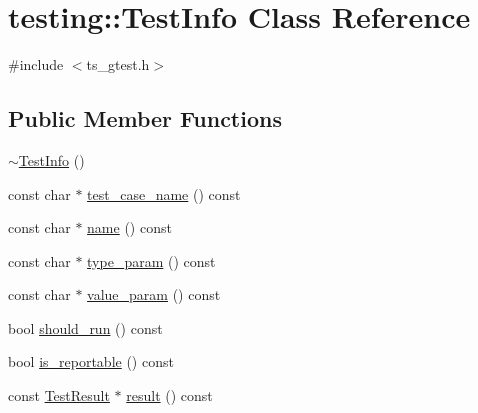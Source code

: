 \hypertarget{classtesting_1_1TestInfo}{\section{testing\-:\-:Test\-Info Class Reference}
\label{classtesting_1_1TestInfo}
}


{\ttfamily \#include $<$ts\-\_\-gtest.\-h$>$}

\subsection*{Public Member Functions}
\begin{DoxyCompactItemize}
\item 
\hyperlink{classtesting_1_1TestInfo_a8d382c1b1b511f0d9112c14684809852}{$\sim$\-Test\-Info} ()
\item 
const char $\ast$ \hyperlink{classtesting_1_1TestInfo_a26d22556d04b94c9cd15e28d74fef91c}{test\-\_\-case\-\_\-name} () const 
\item 
const char $\ast$ \hyperlink{classtesting_1_1TestInfo_ab3d24cad310f0cde29a80b9a83949ff5}{name} () const 
\item 
const char $\ast$ \hyperlink{classtesting_1_1TestInfo_af15d5c533a7237ffc183bc4c924dfcf4}{type\-\_\-param} () const 
\item 
const char $\ast$ \hyperlink{classtesting_1_1TestInfo_a9671fbc0effcb32e98803888dc166a66}{value\-\_\-param} () const 
\item 
bool \hyperlink{classtesting_1_1TestInfo_a240c9fb051d7b0586ed380c6b4e729e4}{should\-\_\-run} () const 
\item 
bool \hyperlink{classtesting_1_1TestInfo_a7ad90aeebb1d6fe3a43c6e3e3427e382}{is\-\_\-reportable} () const 
\item 
const \hyperlink{classtesting_1_1TestResult}{Test\-Result} $\ast$ \hyperlink{classtesting_1_1TestInfo_addea8766df3b8abe4cc4103218a49a65}{result} () const 
\end{DoxyCompactItemize}
